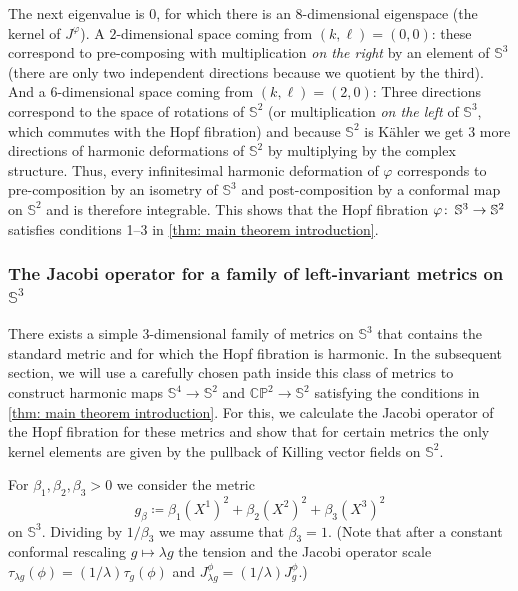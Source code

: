 \documentclass{article}
\numberwithin{equation}{section}        %
\theoremstyle{bfnote}
\theoremstyle{definition}
\theoremstyle{bfremark}
\newcommand{\col}{\colon \thinspace}        %
\newcommand{\Sp}{\mathbb{S}}                %
\begin{document}
The next eigenvalue is $0$, for which there is an $8$-dimensional eigenspace (the kernel of $J^\varphi$). A $2$-dimensional space coming from $(k,\ell) = (0,0)$: these correspond to pre-composing with multiplication \emph{on the right} by an element of $\Sp^3$ (there are only two independent directions because we quotient by the third). And a $6$-dimensional space coming from $(k,\ell) = (2,0)$: Three directions correspond to the space of rotations of $\Sp^2$ (or multiplication \emph{on the left} of $\Sp^3$, which commutes with the Hopf fibration) and because $\Sp^2$ is Kähler we get $3$ more directions of harmonic deformations of $\Sp^2$ by multiplying by the complex structure. Thus, every infinitesimal harmonic deformation of $\varphi$ corresponds to pre-composition by an isometry of $\Sp^3$ and post-composition by a conformal map on $\Sp^2$ and is therefore integrable. This shows that the Hopf fibration $\varphi \col \Sp^3 \to \Sp^2$ satisfies  conditions 1--3 in \cref{thm: main theorem introduction}.


    \subsubsection{The Jacobi operator for a family of left-invariant metrics on $\mathbb{S}^3$}     \label{subsubsec: The Jacobi operator for left-invariant metrics}

There exists a simple 3-dimensional family of metrics on $\Sp^3$ that contains the standard metric and for which the Hopf fibration is harmonic. In the subsequent section, we will use a carefully chosen path inside this class of metrics to construct harmonic maps $\Sp^4 \to \Sp^2$ and $\mathbb{CP}^2 \to \Sp^2$ satisfying the conditions in \cref{thm: main theorem introduction}. For this, we calculate the Jacobi operator of the Hopf fibration for these metrics and show that for certain metrics the only kernel elements are given by the pullback of Killing vector fields on $\Sp^2$. 

For $\beta_1,\beta_2,\beta_3>0$ we consider the metric 
\begin{equation}
    g_\beta \coloneqq \beta_1 (X^1)^2 + \beta_2 (X^2)^2 + \beta_3 (X^3)^2
\end{equation}
on $\Sp^3$. Dividing by $1/\beta_3$ we may assume that $\beta_3=1$. (Note that after a constant conformal rescaling $g \mapsto \lambda g$ the tension and the Jacobi operator scale $\tau_{\lambda g} (\phi) = (1/\lambda) \tau_g (\phi)$ and $J^\phi_{\lambda g} = (1/\lambda) J^\phi_g$.)
\end{document}
